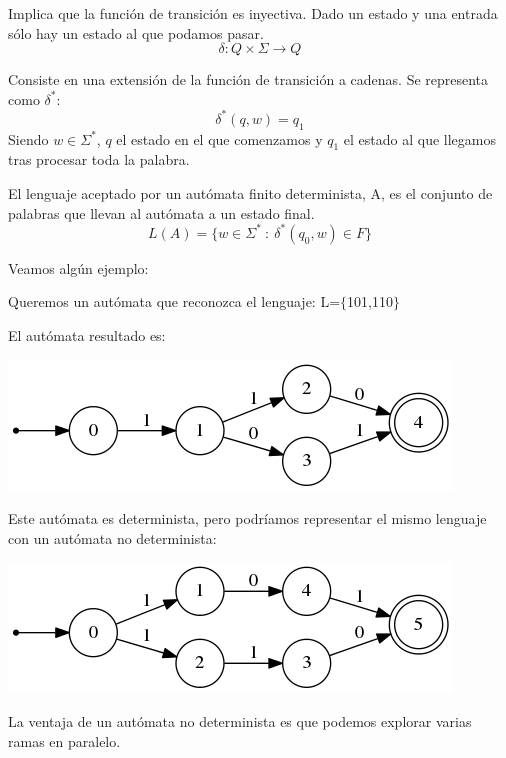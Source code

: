 \documentclass{apuntes}
\begin{document}
\begin{defn}
Implica que la función de transición es inyectiva. Dado un estado y una entrada sólo hay un estado al que podamos pasar.
\[\delta: Q \times \Sigma \rightarrow Q\]
\end{defn}

\begin{defn}
Consiste en una extensión de la función de transición a cadenas. Se representa como $\delta ^*$:
\[\delta^*(q, w)=q_1\]
Siendo $w\in \Sigma ^*$, $q$ el estado en el que comenzamos y $q_1$ el estado al que llegamos tras procesar toda la palabra.
\end{defn}

\begin{defn}
El lenguaje aceptado por un autómata finito determinista, A, es el conjunto de palabras que llevan al autómata a un estado final.
\[L(A) = \lbrace w \in \Sigma^* \ : \ \delta^*(q_0, w) \in F \rbrace\]
\end{defn}

Veamos algún ejemplo:
\begin{example} 
Queremos un autómata que reconozca el lenguaje: L=$\lbrace$101,110$\rbrace$

El autómata resultado es:
\begin{center}
\includegraphics[scale=0.75]{automata2.png}
\end{center}

Este autómata es determinista, pero podríamos representar el mismo lenguaje con un autómata no determinista:

\begin{center}
\includegraphics[scale=0.75]{automata3.png}
\end{center}

La ventaja de un autómata no determinista es que podemos explorar varias ramas en paralelo.
\end{example}
\end{document}
